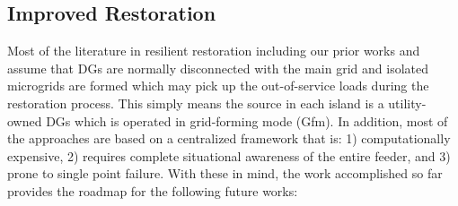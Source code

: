 \documentclass[12pt]{article}
\begin{document}
\subsection{Improved Restoration}
Most of the literature in resilient restoration \cite{gao2016resilience, li2014distribution, chen2018multi, wang2015self, chen2016resilient, 7514755} including our prior works \cite{8421054} and \cite{poudel2019tste} assume that DGs are normally disconnected with the main grid and isolated microgrids are formed which may pick up the out-of-service loads during the restoration process. This simply means the source in each island is a utility-owned DGs which is operated in grid-forming mode (Gfm). In addition, most of the approaches are based on a centralized framework that is: 1) computationally expensive, 2) requires complete situational awareness of the entire feeder, and 3) prone to single point failure. With these in mind, the work accomplished so far provides the roadmap for the following future works:
\end{document}
